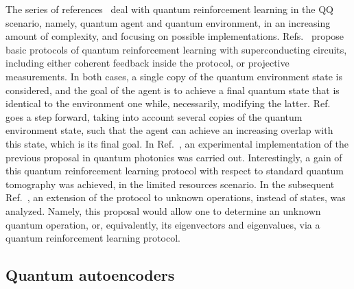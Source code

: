 \documentclass[12pt]{iopart}
\begin{document}
The series of references~\cite{LamataQRL,CardenasQRL,AlbarranQRL,ShangYuQRL,AlbarranMLST} deal with quantum reinforcement learning in the QQ scenario, namely, quantum agent and quantum environment, in an increasing amount of complexity, and focusing on possible implementations. Refs.~\cite{LamataQRL,CardenasQRL} propose basic protocols of quantum reinforcement learning with superconducting circuits, including either coherent feedback inside the protocol, or projective measurements. In both cases, a single copy of the quantum environment state is considered, and the goal of the agent is to achieve a final quantum state that is identical to the environment one while, necessarily, modifying the latter. Ref.~\cite{AlbarranQRL} goes a step forward, taking into account several copies of the quantum environment state, such that the agent can achieve an increasing overlap with this state, which is its final goal. In Ref.~\cite{ShangYuQRL}, an experimental implementation of the previous proposal in quantum photonics was carried out. Interestingly, a gain of this quantum reinforcement learning protocol  with respect to standard quantum tomography was achieved, in the limited resources scenario. In the subsequent Ref.~\cite{AlbarranMLST}, an extension of the protocol to unknown operations, instead of states, was analyzed. Namely, this proposal would allow one to determine an unknown quantum operation, or, equivalently, its eigenvectors and eigenvalues, via a quantum reinforcement learning protocol.





\subsection{Quantum autoencoders}
\end{document}
